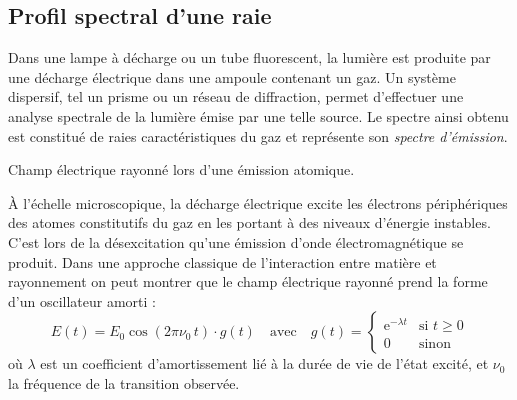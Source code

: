 \subsection{Profil spectral d'une raie} %
\label{sub:profil_spectral_d_une_raie}
Dans une lampe à décharge ou un tube fluorescent, la lumière est produite par une décharge électrique dans une ampoule contenant un gaz. Un système dispersif, tel un prisme ou un réseau de diffraction, permet d'effectuer une analyse spectrale de la lumière émise par une telle source. Le spectre ainsi obtenu est constitué de raies caractéristiques du gaz et représente son \emph{spectre d'émission}.
\begin{marginfigure}[*9]
	\centering
	\caption{Champ électrique rayonné lors d'une émission atomique.}
\end{marginfigure}
À l'échelle microscopique, la décharge électrique excite les électrons périphériques des atomes constitutifs du gaz en les portant à des niveaux d'énergie instables. C'est lors de la désexcitation qu'une émission d'onde électromagnétique se produit. Dans une approche classique de l'interaction entre matière et rayonnement on peut montrer que le champ électrique rayonné prend la forme d'un oscillateur amorti :
\begin{equation}
	E(t)=E_0 \cos(2\pi\nu_0\, t)\cdot g(t)
	\quad\text{avec}\quad
	g(t)=\begin{cases}
		\mathrm{e}^{-\lambda t}&\text{si }t\geq 0\\
		0&\text{sinon}
	\end{cases}
	\label{eq:emission_atomique}
\end{equation}
où \(\lambda\) est un coefficient d'amortissement lié à la durée de vie de l'état excité, et \(\nu_0\) la fréquence de la transition observée.

